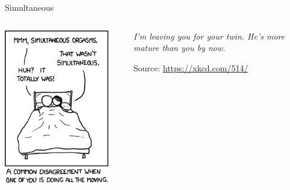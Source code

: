 
\begin{frame}[t,plain]
\titlepage
\end{frame}


\begin{frame}{Simultaneous}
%
\begin{columns}[T]
\begin{center}
	\includegraphics[width=.55\linewidth]{./gfx/xkcd-simultaneous}
\end{center}
%
\begin{center}

\end{center}
\begin{center}
	\emph{I'm leaving you for your twin. He's more mature than you by now.}
	
	\vspace{12pt}
	Source: \url{https://xkcd.com/514/}
\end{center}
\end{columns}
%
\end{frame}


